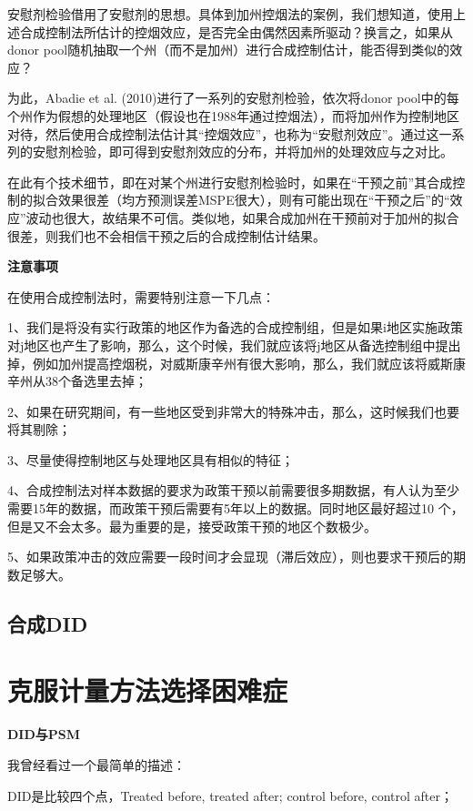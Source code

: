 \documentclass[cn,12pt,math=newtx,citestyle=gb7714-2015,bibstyle=gb7714-2015]{elegantbook}
\begin{document}
	安慰剂检验借用了安慰剂的思想。具体到加州控烟法的案例，我们想知道，使用上述合成控制法所估计的控烟效应，是否完全由偶然因素所驱动？换言之，如果从donor pool随机抽取一个州（而不是加州）进行合成控制估计，能否得到类似的效应？
	
	为此，Abadie et al. (2010)进行了一系列的安慰剂检验，依次将donor pool中的每个州作为假想的处理地区（假设也在1988年通过控烟法），而将加州作为控制地区对待，然后使用合成控制法估计其“控烟效应”，也称为“安慰剂效应”。通过这一系列的安慰剂检验，即可得到安慰剂效应的分布，并将加州的处理效应与之对比。
	
	在此有个技术细节，即在对某个州进行安慰剂检验时，如果在“干预之前”其合成控制的拟合效果很差（均方预测误差MSPE很大），则有可能出现在“干预之后”的“效应”波动也很大，故结果不可信。类似地，如果合成加州在干预前对于加州的拟合很差，则我们也不会相信干预之后的合成控制估计结果。
	
	\textbf{注意事项}
	
	在使用合成控制法时，需要特别注意一下几点：
	
	1、我们是将没有实行政策的地区作为备选的合成控制组，但是如果i地区实施政策对j地区也产生了影响，那么，这个时候，我们就应该将j地区从备选控制组中提出掉，例如加州提高控烟税，对威斯康辛州有很大影响，那么，我们就应该将威斯康辛州从38个备选里去掉；
	
	2、如果在研究期间，有一些地区受到非常大的特殊冲击，那么，这时候我们也要将其剔除；
	
	3、尽量使得控制地区与处理地区具有相似的特征；
	
	4、合成控制法对样本数据的要求为政策干预以前需要很多期数据，有人认为至少需要15年的数据，而政策干预后需要有5年以上的数据。同时地区最好超过10 个，但是又不会太多。最为重要的是，接受政策干预的地区个数极少。
	
	5、如果政策冲击的效应需要一段时间才会显现（滞后效应），则也要求干预后的期数足够大。
	
	\subsection{合成DID}
	
	
	
	\section{克服计量方法选择困难症}
	\textbf{DID与PSM}
	
	我曾经看过一个最简单的描述：
	
	DID是比较四个点，Treated before, treated after; control before, control after；
	
\end{document}
